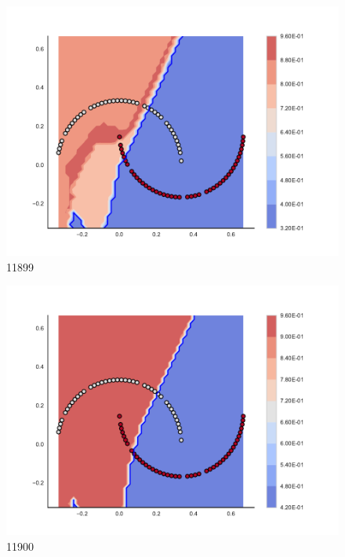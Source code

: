 \begin{subfigure}[b]{0.09\textwidth}
    \includegraphics[clip, trim=2.35cm 1.75cm 4.5cm 0cm,width=\textwidth]{img/convergence/11899.pdf}
    \caption{11899}
    \label{fig:convergence_11899}
\end{subfigure}
%
\begin{subfigure}[b]{0.09\textwidth}
    \includegraphics[clip, trim=2.35cm 1.75cm 4.5cm 0cm,width=\textwidth]{img/convergence/11900.pdf}
    \caption{11900}
    \label{fig:convergence_11900}
\end{subfigure}
%
